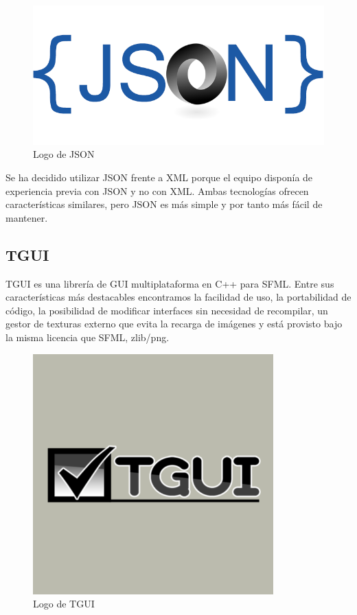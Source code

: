 		\begin{figure}[!htp]
			 \centering
			 \includegraphics{fig/json}
			 \caption{Logo de JSON}
			 \label{fig:json}
		\end{figure}

		Se ha decidido utilizar JSON frente a XML porque el equipo disponía de experiencia previa con JSON y no con XML. Ambas tecnologías ofrecen características similares, pero JSON es más simple y por tanto más fácil de mantener.

	\subsection{TGUI}

		TGUI es una librería de GUI multiplataforma en C++ para SFML. Entre sus características más destacables encontramos la facilidad de uso, la portabilidad de código, la posibilidad de modificar interfaces sin necesidad de recompilar, un gestor de texturas externo que evita la recarga de imágenes y está provisto bajo la misma licencia que SFML, zlib/png.

		\begin{figure}[!htp]
			 \centering
			 \includegraphics{fig/tgui}
			 \caption{Logo de TGUI}
			 \label{fig:tgui}
		\end{figure}

